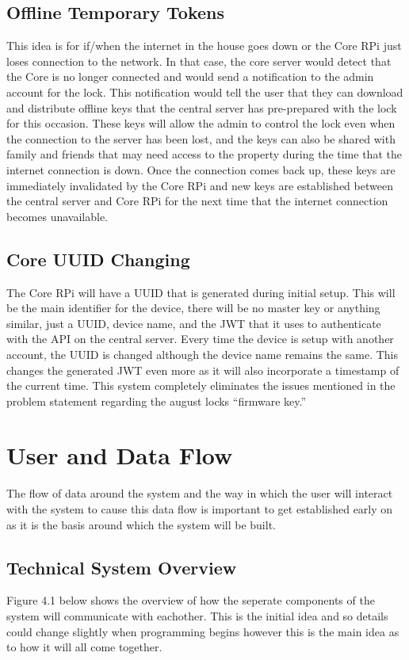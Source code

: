 \subsection{Offline Temporary Tokens}
This idea is for if/when the internet in the house goes down or the Core RPi just loses connection to the network. In that case, the core server would detect that the Core is no longer connected and would send a notification to the admin account for the lock. This notification would tell the user that they can download and distribute offline keys that the central server has pre-prepared with the lock for this occasion. These keys will allow the admin to control the lock even when the connection to the server has been lost, and the keys can also be shared with family and friends that may need access to the property during the time that the internet connection is down. Once the connection comes back up, these keys are immediately invalidated by the Core RPi and new keys are established between the central server and Core RPi for the next time that the internet connection becomes unavailable.

\subsection{Core UUID Changing}
The Core RPi will have a UUID that is generated during initial setup. This will be the main identifier for the device, there will be no master key or anything similar, just a UUID, device name, and the JWT that it uses to authenticate with the API on the central server. Every time the device is setup with another account, the UUID is changed although the device name remains the same. This changes the generated JWT even more as it will also incorporate a timestamp of the current time. This system completely eliminates the issues mentioned in the problem statement regarding the august locks ``firmware key.''

\section{User and Data Flow}
The flow of data around the system and the way in which the user will interact with the system to cause this data flow is important to get established early on as it is the basis around which the system will be built.

\subsection{Technical System Overview}
Figure 4.1 below shows the overview of how the seperate components of the system will communicate with eachother. This is the initial idea and so details could change slightly when programming begins however this is the main idea as to how it will all come together.

